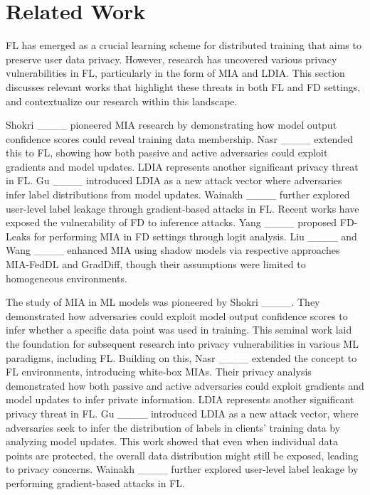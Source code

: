 \section{Related Work}
\label{sec:related}
FL has emerged as a crucial learning scheme for distributed training that aims to preserve user data privacy. 
However, research has uncovered various privacy vulnerabilities in FL, particularly in the form of MIA and LDIA.
This section discusses relevant works that highlight these threats in both FL and FD settings, and contextualize our research within this landscape.

Shokri \etal____ pioneered MIA research by demonstrating how model output confidence scores could reveal training data membership. 
Nasr \etal____ extended this to FL, showing how both passive and active adversaries could exploit gradients and model updates.
LDIA represents another significant privacy threat in FL.
Gu \etal____ introduced LDIA as a new attack vector where adversaries infer label distributions from model updates. Wainakh \etal____ further explored user-level label leakage through gradient-based attacks in FL.
Recent works have exposed the vulnerability of FD to inference attacks.
Yang \etal____ proposed FD-Leaks for performing MIA in FD settings through logit analysis. Liu \etal____ and Wang \etal____ enhanced MIA using shadow models via respective approaches MIA-FedDL and GradDiff, though their assumptions were limited to homogeneous environments.

\iffalse
The study of MIA in ML models was pioneered by Shokri \etal____.
They demonstrated how adversaries could exploit model output confidence scores to infer whether a specific data point was used in training.
This seminal work laid the foundation for subsequent research into privacy vulnerabilities in various ML paradigms, including FL.
Building on this, Nasr \etal____ extended the concept to FL environments, introducing white-box MIAs.
Their privacy analysis demonstrated how both passive and active adversaries could exploit gradients and model updates to infer private information.
LDIA represents another significant privacy threat in FL.
Gu \etal____ introduced LDIA as a new attack vector, where adversaries seek to infer the distribution of labels in clients' training data by analyzing model updates.
This work showed that even when individual data points are protected, the overall data distribution might still be exposed, leading to privacy concerns.
Wainakh \etal____ further explored user-level label leakage by performing gradient-based attacks in FL.

